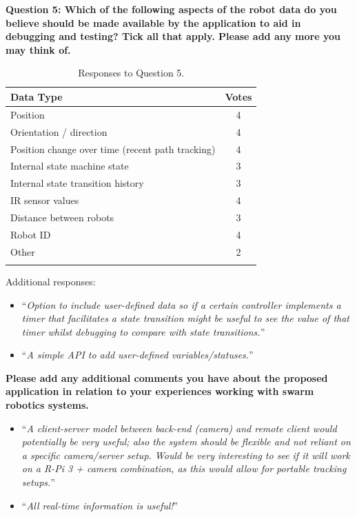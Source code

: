 \noindent\textbf{Question 5: Which of the following aspects of the robot data do you believe should be made available by the application to aid in debugging and testing? Tick all that apply. Please add any more you may think of.}

\begin{longtable}{ p{10cm} c }
 \textbf{Data Type} & \textbf{Votes}\\ 
 \hline
 Position & 4\\
 Orientation / direction & 4\\
 Position change over time (recent path tracking) & 4\\
 Internal state machine state & 3\\
 Internal state transition history & 3\\
 IR sensor values & 4\\
 Distance between robots & 3\\
 Robot ID & 4\\
 Other & 2\\
 \bottomrule
 \caption{Responses to Question 5.}
 \label{tab:QuestionFiveData}
\end{longtable}

Additional responses:

\begin{itemize}
\item ``\textit{Option to include user-defined data so if a certain controller implements a timer that facilitates a state transition might be useful to see the value of that timer whilst debugging to compare with state transitions.}''
\item ``\textit{A simple API to add user-defined variables/statuses.}''
\end{itemize}

\noindent\textbf{Please add any additional comments you have about the proposed application in relation to your experiences working with swarm robotics systems.}

\begin{itemize}
\item ``\textit{A client-server model between back-end (camera) and remote client would potentially be very useful; also the system should be flexible and not reliant on a specific camera/server setup. Would be very interesting to see if it will work on a R-Pi 3 + camera combination, as this would allow for portable tracking setups.}''
\item ``\textit{All real-time information is useful!}''
\end{itemize}

